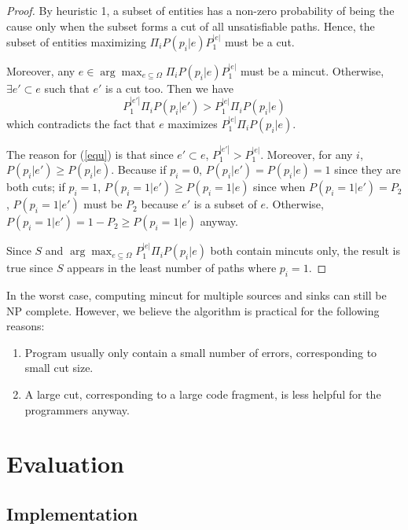 \begin{proof}
By heuristic 1, a subset of entities has a non-zero probability of being
the cause only when the subset forms a cut of all unsatisfiable paths. Hence,
the subset of entities maximizing $\Pi_i P(p_i|e) P_1^{|e|}$ must be a cut.

Moreover, any $e\in \arg\max_{e\subseteq \Omega}\Pi_i P(p_i|e) P_1^{|e|}$ must
be a mincut. Otherwise, $\exists e'\subset e$ such that $e'$ is a cut too. Then
we have
\begin{equation}
\label{equ}
P_1^{|e'|} \Pi_i P(p_i|e') > P_1^{|e|} \Pi_i P(p_i|e)
\end{equation}
which contradicts the fact that $e$ maximizes $P_1^{|e|} \Pi_i P(p_i|e)$.

\iftr
The reason for (\ref{equ}) is that since $e'\subset e$, $P_1^{|e'|}>
P_1^{|e|}$. Moreover, for any $i$,  $P(p_i|e') \geq P(p_i|e)$. Because if
$p_i=0$, $P(p_i|e')=P(p_i|e)=1$ since they are both cuts; if $p_i=1$,
$P(p_i=1|e')\geq P(p_i=1|e)$ since when $P(p_i=1|e')=P_2$,
$P(p_i=1|e')$ must be $P_2$ because $e'$ is a subset of $e$.
Otherwise, $P(p_i=1|e')=1-P_2\geq P(p_i=1|e)$ anyway.

Since $S$ and $\arg\max_{e\subseteq \Omega}P_1^{|e|} \Pi_i P(p_i|e)$ both
contain mincuts only, the result is true since $S$ appears in the least
number of paths where $p_i=1$.
\fi
\end{proof}

In the worst case, computing mincut for multiple sources and sinks can
still be NP complete. However, we believe the algorithm is practical
for the following reasons:
\begin{enumerate}
\item Program usually only contain a small number of errors, corresponding to
small cut size.

\item A large cut, corresponding to a large code fragment, is
less helpful for the programmers anyway.
\end{enumerate}


\section{Evaluation}
\label{sec:evaluation}

\subsection{Implementation}

